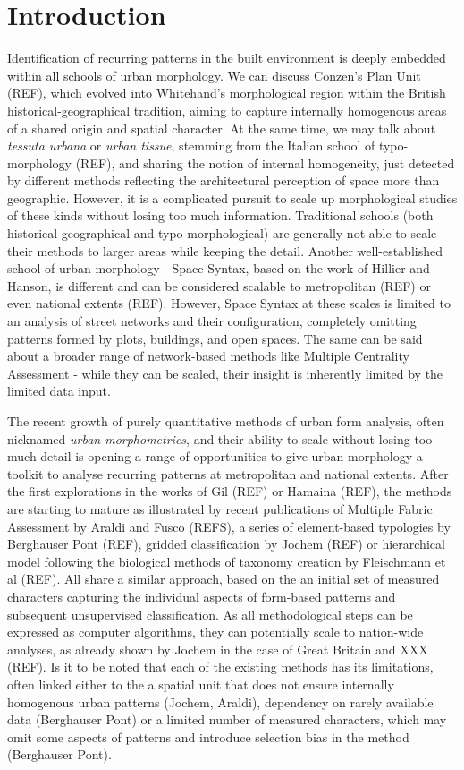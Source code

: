 \section{Introduction}
\label{sec:intro}


Identification of recurring patterns in the built environment is deeply embedded
within all schools of urban morphology. We can discuss Conzen's Plan Unit (REF), which
evolved into Whitehand's morphological region within the British historical-geographical
tradition, aiming to capture internally homogenous areas of a shared origin and spatial
character. At the same time, we may talk about \textit{tessuta urbana} or \textit{urban
tissue}, stemming from the Italian school of typo-morphology (REF), and sharing the
notion of internal homogeneity, just detected by different methods reflecting
the architectural perception of space more than geographic. However, it is a complicated
pursuit to scale up morphological studies of these kinds without losing too much
information. Traditional schools (both historical-geographical and typo-morphological)
are generally not able to scale their methods to larger areas while keeping the detail.
Another well-established school of urban morphology - Space Syntax, based on the work of
Hillier and Hanson, is different and can be considered scalable to metropolitan (REF) or
even national extents (REF). However, Space Syntax at these scales is limited to an
analysis of street networks and their configuration, completely omitting patterns formed
by plots, buildings, and open spaces. The same can be said about a broader range of
network-based methods like Multiple Centrality Assessment - while they can be scaled,
their insight is inherently limited by the limited data input.

The recent growth of purely quantitative methods of urban form analysis, often nicknamed
\textit{urban morphometrics}, and their ability to scale without losing too much detail
is opening a range of opportunities to give urban morphology a toolkit to analyse
recurring patterns at metropolitan and national extents. After the first explorations in
the works of Gil (REF) or Hamaina (REF), the methods are starting to mature as
illustrated by recent publications of Multiple Fabric Assessment by Araldi and Fusco
(REFS), a series of element-based typologies by Berghauser Pont (REF), gridded
classification by Jochem (REF) or hierarchical model following the biological methods of
taxonomy creation by Fleischmann et al (REF). All share a similar approach, based on the
an initial set of measured characters capturing the individual aspects of form-based
patterns and subsequent unsupervised classification. As all methodological steps can be
expressed as computer algorithms, they can potentially scale to nation-wide analyses, as
already shown by Jochem in the case of Great Britain and XXX (REF). Is it to be noted
that each of the existing methods has its limitations, often linked either to the
a spatial unit that does not ensure internally homogenous urban patterns (Jochem,
Araldi), dependency on rarely available data (Berghauser Pont) or a limited number of
measured characters, which may omit some aspects of patterns and introduce selection bias
in the method (Berghauser Pont).

